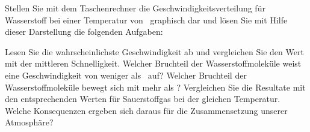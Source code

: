 Stellen Sie mit dem Taschenrechner die Geschwindigkeitsverteilung für Wasserstoff bei einer Temperatur von \THO\ graphisch dar und lösen Sie mit Hilfe dieser Darstellung die folgenden Aufgaben:
\begin{abcliste}
\abc Lesen Sie die wahrscheinlichste Geschwindigkeit ab und vergleichen Sie den Wert mit der mittleren Schnelligkeit.
\abc Welcher Bruchteil der Wasserstoffmoleküle weist eine Geschwindigkeit von weniger als \vgAO\ auf?
\abc Welcher Bruchteil der Wasserstoffmoleküle bewegt sich mit mehr als \vgBO?
\abc Vergleichen Sie die Resultate mit den entsprechenden Werten für Sauerstoffgas bei der gleichen Temperatur. Welche Konsequenzen ergeben sich daraus für die Zusammensetzung unserer Atmosphäre?
\end{abcliste}
